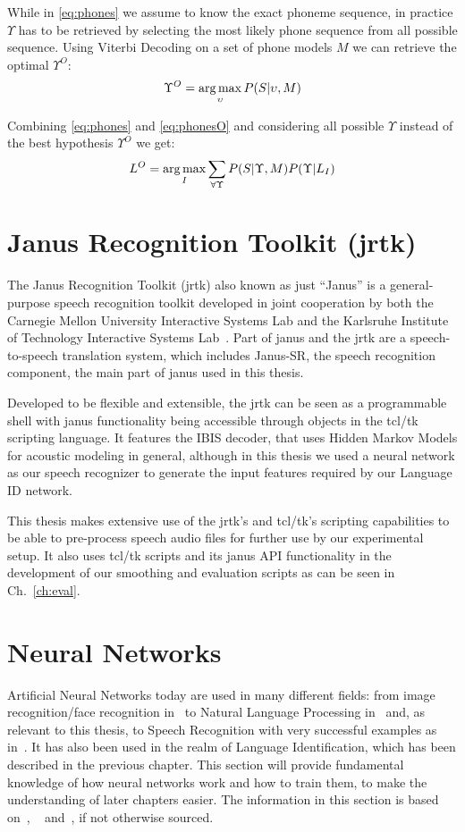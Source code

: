 While in \ref{eq:phones} we assume to know the exact phoneme sequence, in practice \(\Upsilon\) has to be retrieved by selecting the most likely phone sequence from all possible sequence. Using Viterbi Decoding on a set of phone models \(M\) we can retrieve the optimal \(\Upsilon^O\):
\begin{equation}
\label{eq:phonesO}
\Upsilon^O = \operatorname*{arg\,max}_{\upsilon} P(S|\upsilon, M)
\end{equation} 

Combining \ref{eq:phones} and \ref{eq:phonesO} and considering all possible \(\Upsilon\) instead of the best hypothesis \(\Upsilon^O\) we get:
\begin{equation}
L^O = \operatorname*{arg\,max}_{I}\sum_{\forall \Upsilon}P(S|\Upsilon, M)P(\Upsilon|L_I)
\end{equation}

\section{Janus Recognition Toolkit (jrtk)}
\label{sec:fund:jrtk}
The Janus Recognition Toolkit (jrtk) also known as just ``Janus'' is a general-purpose speech recognition toolkit developed in joint cooperation by both the Carnegie Mellon University Interactive Systems Lab and the Karlsruhe Institute of Technology Interactive Systems Lab~\cite{lavie1997janus}. Part of janus and the jrtk are a speech-to-speech translation system, which includes Janus-SR, the speech recognition component, the main part of janus used in this thesis. 

Developed to be flexible and extensible, the jrtk can be seen as a programmable shell with janus functionality being accessible through objects in the tcl/tk scripting language. It features the IBIS decoder, that uses Hidden Markov Models for acoustic modeling in general, although in this thesis we used a neural network as our speech recognizer to generate the input features required by our Language ID network.

This thesis makes extensive use of the jrtk's and tcl/tk's scripting capabilities to be able to pre-process speech audio files for further use by our experimental setup. It also uses tcl/tk scripts and its janus API functionality in the development of our smoothing and evaluation scripts as can be seen in Ch.~\ref{ch:eval}.
\section{Neural Networks}
\label{sec:fund:NN}
Artificial Neural Networks today are used in many different fields: from image recognition/face recognition in~\cite{lawrence1997face} to Natural Language Processing in~\cite{collobert2008unified} and, as relevant to this thesis, to Speech Recognition with very successful examples as in~\cite{hinton2012deep}. It has also been used in the realm of Language Identification, which has been described in the previous chapter. This section will provide fundamental knowledge of how neural networks work and how to train them, to make the understanding of later chapters easier. The information in this section is based on~\cite{haykin2004comprehensive}, ~\cite{Goodfellow-et-al-2016} and~\cite{deeplearning-online}, if not otherwise sourced.


